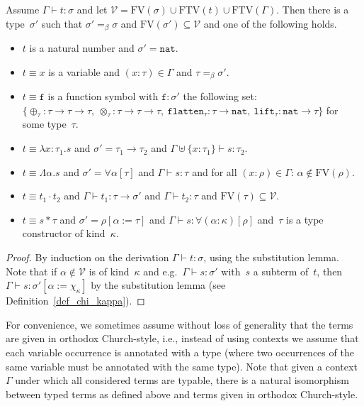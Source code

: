 \documentclass[runningheads,a4paper]{llncs}
\newcommand{\quant}[2]{\forall #1[#2]}
\newcommand{\arrtype}{\rightarrow}
\newcommand{\abs}[2]{\lambda #1.#2}
\newcommand{\tabs}[2]{\Lambda #1.#2}
\newcommand{\app}[2]{#1 \cdot #2}
\newcommand{\tapp}[2]{#1 * #2}
\newcommand{\subst}[2]{#1:=#2}
\newcommand{\FTV}{\mathrm{FTV}}
\newcommand{\FV}{\mathrm{FV}}
\newcommand{\Vc}{\mathcal{V}}
\newcommand{\nat}{\mathtt{nat}}
\newcommand{\flatten}{\mathtt{flatten}}
\newcommand{\lift}{\mathtt{lift}}
\newcommand{\proves}{\vdash}
\begin{document}
\begin{lemma}
  Assume $\Gamma \proves t : \sigma$ and let
  $\Vc = \FV(\sigma) \cup \FTV(t) \cup \FTV(\Gamma)$. Then there is a
  type~$\sigma'$ such that $\sigma' =_\beta \sigma$ and
  $\FV(\sigma') \subseteq \Vc$ and one of the following holds.
  \begin{itemize}
  \item $t$ is a natural number and $\sigma' = \nat$.
  \item $t \equiv x$ is a variable and $(x : \tau) \in \Gamma$ and $\tau
    =_\beta \sigma'$.
  \item $t \equiv \mathtt{f}$ is a function symbol with $\mathtt{f} :
    \sigma'$ the following set: $\{ \oplus_{\tau} : \tau \arrtype \tau
    \arrtype \tau,\ \otimes_{\tau} : \tau \arrtype \tau \arrtype
    \tau,\ \flatten_{\tau} : \tau \arrtype \nat,\ \lift_{\tau} : \nat
    \arrtype \tau \}$ for some type~$\tau$.
  \item $t \equiv \abs{x:\tau_1}{s}$ and
    $\sigma'=\tau_1\arrtype\tau_2$ and $\Gamma \uplus \{ x : \tau_1 \}
    \vdash s : \tau_2$.
  \item $t \equiv \tabs{\alpha}{s}$ and
    $\sigma' = \quant{\alpha}{\tau}$ and $\Gamma \vdash s : \tau$ and
    for all $(x : \rho) \in \Gamma$: $\alpha \notin \FV(\rho)$.
  \item $t \equiv \app{t_1}{t_2}$ and
    $\Gamma \vdash t_1 : \tau \arrtype \sigma'$ and
    $\Gamma \vdash t_2 : \tau$ and $\FV(\tau) \subseteq \Vc$.
  \item $t \equiv \tapp{s}{\tau}$ and
    $\sigma' = \rho[\subst{\alpha}{\tau}]$ and
    $\Gamma \vdash s : \quant{(\alpha:\kappa)}{\rho}$ and~$\tau$ is a
    type constructor of kind~$\kappa$.
  \end{itemize}
\end{lemma}

\begin{proof}
  By induction on the derivation $\Gamma \proves t : \sigma$, using
  the substitution lemma. Note that if $\alpha \notin \Vc$ is of
  kind~$\kappa$ and e.g.~$\Gamma \proves s : \sigma'$ with~$s$ a
  subterm of~$t$, then
  $\Gamma \proves s : \sigma'[\subst{\alpha}{\chi_\kappa}]$ by the
  substitution lemma (see Definition~\ref{def_chi_kappa}).
\end{proof}

For convenience, we sometimes assume without loss of generality that
the terms are given in orthodox Church-style, i.e., instead of using
contexts we assume that each variable occurrence is annotated with a
type (where two occurrences of the same variable must be annotated
with the same type). Note that given a context~$\Gamma$ under which
all considered terms are typable, there is a natural isomorphism
between typed terms as defined above and terms given in orthodox
Church-style.
\end{document}
